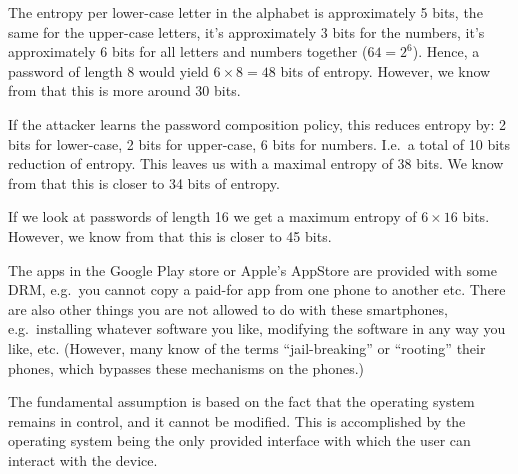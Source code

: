 \documentclass[svv,addpoints]{miunexam}
\begin{document}
\begin{questions}
\begin{solution}
    The entropy per lower-case letter in the alphabet is approximately 5 bits, 
    the same for the upper-case letters, it's approximately 3 bits for the 
    numbers, it's approximately 6 bits for all letters and numbers together 
    (\(64 = 2^6\)).
    Hence, a password of length 8 would yield \(6\times 8 = 48\) bits of 
    entropy.
    However, we know from \cite{Komanduri2011opa} that this is more around 30 
    bits.

    If the attacker learns the password composition policy, this reduces 
    entropy by:
    2 bits for lower-case,
    2 bits for upper-case,
    6 bits for numbers.
    I.e.\ a total of 10 bits reduction of entropy.
    This leaves us with a maximal entropy of 38 bits.
    We know from \cite{Komanduri2011opa} that this is closer to 34 bits of 
    entropy.

    If we look at passwords of length 16 we get a maximum entropy of \(6\times 
    16\) bits.
    However, we know from \cite{Komanduri2011opa} that this is closer to 45 
    bits.
  \end{solution}


  \question\label{q:drm}
  The apps in the Google Play store or Apple's AppStore are provided with some 
  DRM, e.g.\ you cannot copy a paid-for app from one phone to another etc.
  There are also other things you are not allowed to do with these smartphones, 
  e.g.\ installing whatever software you like, modifying the software in any 
  way you like, etc.
  (However, many know of the terms ``jail-breaking'' or ``rooting'' their 
  phones, which bypasses these mechanisms on the phones.)

  
  \begin{solution}
    The fundamental assumption is based on the fact that the operating system 
    remains in control, and it cannot be modified.
    This is accomplished by the operating system being the only provided 
    interface with which the user can interact with the device.


\end{solution}
\end{questions}
\end{document}
